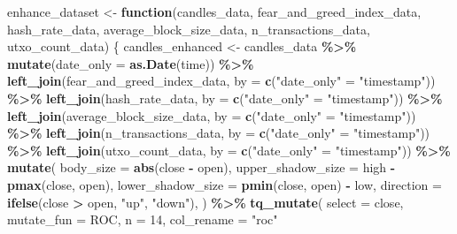 \documentclass[
]{article}
\newenvironment{Shaded}{\begin{snugshade}}{\end{snugshade}}
\newcommand{\AttributeTok}[1]{\textcolor[rgb]{0.13,0.29,0.53}{#1}}
\newcommand{\ControlFlowTok}[1]{\textcolor[rgb]{0.13,0.29,0.53}{\textbf{#1}}}
\newcommand{\DecValTok}[1]{\textcolor[rgb]{0.00,0.00,0.81}{#1}}
\newcommand{\FunctionTok}[1]{\textcolor[rgb]{0.13,0.29,0.53}{\textbf{#1}}}
\newcommand{\NormalTok}[1]{#1}
\newcommand{\OtherTok}[1]{\textcolor[rgb]{0.56,0.35,0.01}{#1}}
\newcommand{\SpecialCharTok}[1]{\textcolor[rgb]{0.81,0.36,0.00}{\textbf{#1}}}
\newcommand{\StringTok}[1]{\textcolor[rgb]{0.31,0.60,0.02}{#1}}
\begin{document}
\begin{Shaded}
\begin{Highlighting}[]
\NormalTok{enhance\_dataset }\OtherTok{\textless{}{-}} \ControlFlowTok{function}\NormalTok{(candles\_data, fear\_and\_greed\_index\_data, hash\_rate\_data, average\_block\_size\_data, n\_transactions\_data, utxo\_count\_data) \{}
\NormalTok{  candles\_enhanced }\OtherTok{\textless{}{-}}\NormalTok{ candles\_data }\SpecialCharTok{\%\textgreater{}\%}
    \FunctionTok{mutate}\NormalTok{(}\AttributeTok{date\_only =} \FunctionTok{as.Date}\NormalTok{(time)) }\SpecialCharTok{\%\textgreater{}\%}
    \FunctionTok{left\_join}\NormalTok{(fear\_and\_greed\_index\_data, }\AttributeTok{by =} \FunctionTok{c}\NormalTok{(}\StringTok{"date\_only"} \OtherTok{=} \StringTok{"timestamp"}\NormalTok{)) }\SpecialCharTok{\%\textgreater{}\%}
    \FunctionTok{left\_join}\NormalTok{(hash\_rate\_data, }\AttributeTok{by =} \FunctionTok{c}\NormalTok{(}\StringTok{"date\_only"} \OtherTok{=} \StringTok{"timestamp"}\NormalTok{)) }\SpecialCharTok{\%\textgreater{}\%}
    \FunctionTok{left\_join}\NormalTok{(average\_block\_size\_data, }\AttributeTok{by =} \FunctionTok{c}\NormalTok{(}\StringTok{"date\_only"} \OtherTok{=} \StringTok{"timestamp"}\NormalTok{)) }\SpecialCharTok{\%\textgreater{}\%}
    \FunctionTok{left\_join}\NormalTok{(n\_transactions\_data, }\AttributeTok{by =} \FunctionTok{c}\NormalTok{(}\StringTok{"date\_only"} \OtherTok{=} \StringTok{"timestamp"}\NormalTok{)) }\SpecialCharTok{\%\textgreater{}\%}
    \FunctionTok{left\_join}\NormalTok{(utxo\_count\_data, }\AttributeTok{by =} \FunctionTok{c}\NormalTok{(}\StringTok{"date\_only"} \OtherTok{=} \StringTok{"timestamp"}\NormalTok{)) }\SpecialCharTok{\%\textgreater{}\%}
    \FunctionTok{mutate}\NormalTok{(}
      \AttributeTok{body\_size =} \FunctionTok{abs}\NormalTok{(close }\SpecialCharTok{{-}}\NormalTok{ open),}
      \AttributeTok{upper\_shadow\_size =}\NormalTok{ high }\SpecialCharTok{{-}} \FunctionTok{pmax}\NormalTok{(close, open),}
      \AttributeTok{lower\_shadow\_size =} \FunctionTok{pmin}\NormalTok{(close, open) }\SpecialCharTok{{-}}\NormalTok{ low,}
      \AttributeTok{direction =} \FunctionTok{ifelse}\NormalTok{(close }\SpecialCharTok{\textgreater{}}\NormalTok{ open, }\StringTok{"up"}\NormalTok{, }\StringTok{"down"}\NormalTok{),}
\NormalTok{    ) }\SpecialCharTok{\%\textgreater{}\%}
    \FunctionTok{tq\_mutate}\NormalTok{(}
      \AttributeTok{select =}\NormalTok{ close,}
      \AttributeTok{mutate\_fun =}\NormalTok{ ROC,}
      \AttributeTok{n =} \DecValTok{14}\NormalTok{,}
      \AttributeTok{col\_rename =} \StringTok{"roc"}

\end{Highlighting}
\end{Shaded}
\end{document}
